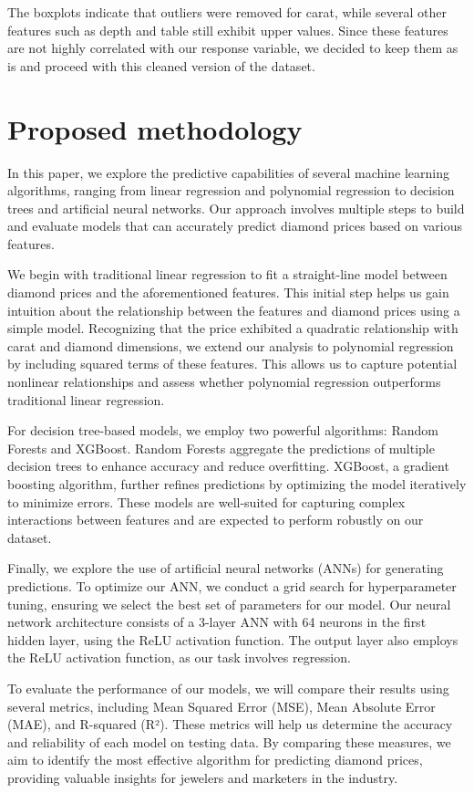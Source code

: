 \documentclass[conference]{IEEEtran}
\begin{document}
The boxplots indicate that outliers were removed for carat, while several other features such as depth and table still exhibit upper values. Since these features are not highly correlated with our response variable, we decided to keep them as is and proceed with this cleaned version of the dataset.

\section{Proposed methodology}

In this paper, we explore the predictive capabilities of several machine learning algorithms, ranging from linear regression and polynomial regression to decision trees and artificial neural networks. Our approach involves multiple steps to build and evaluate models that can accurately predict diamond prices based on various features.

We begin with traditional linear regression to fit a straight-line model between diamond prices and the aforementioned features. This initial step helps us gain intuition about the relationship between the features and diamond prices using a simple model. Recognizing that the price exhibited a quadratic relationship with carat and diamond dimensions, we extend our analysis to polynomial regression by including squared terms of these features. This allows us to capture potential nonlinear relationships and assess whether polynomial regression outperforms traditional linear regression.

For decision tree-based models, we employ two powerful algorithms: Random Forests and XGBoost. Random Forests aggregate the predictions of multiple decision trees to enhance accuracy and reduce overfitting. XGBoost, a gradient boosting algorithm, further refines predictions by optimizing the model iteratively to minimize errors. These models are well-suited for capturing complex interactions between features and are expected to perform robustly on our dataset.

Finally, we explore the use of artificial neural networks (ANNs) for generating predictions. To optimize our ANN, we conduct a grid search for hyperparameter tuning, ensuring we select the best set of parameters for our model. Our neural network architecture consists of a 3-layer ANN with 64 neurons in the first hidden layer, using the ReLU activation function. The output layer also employs the ReLU activation function, as our task involves regression.

To evaluate the performance of our models, we will compare their results using several metrics, including Mean Squared Error (MSE), Mean Absolute Error (MAE), and R-squared (R²). These metrics will help us determine the accuracy and reliability of each model on testing data. By comparing these measures, we aim to identify the most effective algorithm for predicting diamond prices, providing valuable insights for jewelers and marketers in the industry.
\end{document}
